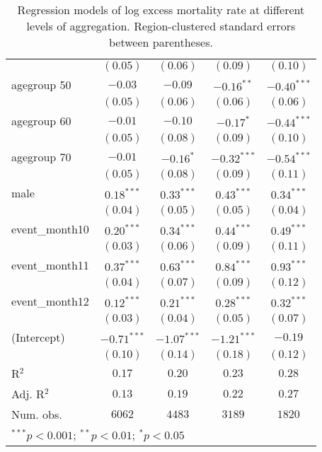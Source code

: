 \begin{table}
\begin{center}
\begin{tabular}{l c c c c}
                & $(0.05)$      & $(0.06)$      & $(0.09)$      & $(0.10)$      \\
agegroup 50     & $-0.03$       & $-0.09$       & $-0.16^{**}$  & $-0.40^{***}$ \\
                & $(0.05)$      & $(0.06)$      & $(0.06)$      & $(0.06)$      \\
agegroup 60     & $-0.01$       & $-0.10$       & $-0.17^{*}$   & $-0.44^{***}$ \\
                & $(0.05)$      & $(0.08)$      & $(0.09)$      & $(0.10)$      \\
agegroup 70     & $-0.01$       & $-0.16^{*}$   & $-0.32^{***}$ & $-0.54^{***}$ \\
                & $(0.05)$      & $(0.08)$      & $(0.09)$      & $(0.11)$      \\
male            & $0.18^{***}$  & $0.33^{***}$  & $0.43^{***}$  & $0.34^{***}$  \\
                & $(0.04)$      & $(0.05)$      & $(0.05)$      & $(0.04)$      \\
event\_month10  & $0.20^{***}$  & $0.34^{***}$  & $0.44^{***}$  & $0.49^{***}$  \\
                & $(0.03)$      & $(0.06)$      & $(0.09)$      & $(0.11)$      \\
event\_month11  & $0.37^{***}$  & $0.63^{***}$  & $0.84^{***}$  & $0.93^{***}$  \\
                & $(0.04)$      & $(0.07)$      & $(0.09)$      & $(0.12)$      \\
event\_month12  & $0.12^{***}$  & $0.21^{***}$  & $0.28^{***}$  & $0.32^{***}$  \\
                & $(0.03)$      & $(0.04)$      & $(0.05)$      & $(0.07)$      \\
(Intercept)     & $-0.71^{***}$ & $-1.07^{***}$ & $-1.21^{***}$ & $-0.19$       \\
                & $(0.10)$      & $(0.14)$      & $(0.18)$      & $(0.12)$      \\
\hline
R$^2$           & $0.17$        & $0.20$        & $0.23$        & $0.28$        \\
Adj. R$^2$      & $0.13$        & $0.19$        & $0.22$        & $0.27$        \\
Num. obs.       & $6062$        & $4483$        & $3189$        & $1820$        \\
\hline
\multicolumn{5}{l}{\scriptsize{$^{***}p<0.001$; $^{**}p<0.01$; $^{*}p<0.05$}}
\end{tabular}
\caption{Regression models of log excess mortality rate at different levels of aggregation. Region-clustered standard errors between parentheses.}
\label{tab:regionmodels}
\end{center}
\end{table}
